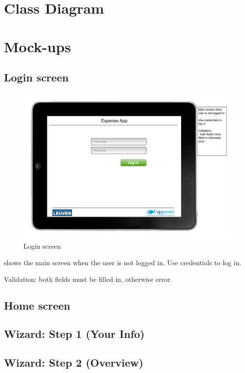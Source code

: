 

\section{Class Diagram}

\section{Mock-ups}

\subsection{Login screen}

\begin{figure}[h!]
    \includegraphics[width=\textwidth]{figs/poc/login-screen.pdf}
    \caption{Login screen}
    \label{fig:app-login-screen}
\end{figure}

 shows the main screen when the user is not logged in. Use credentials to log in.

Validation: both fields must be filled in, otherwise error.

\subsection{Home screen}

\subsection{Wizard: Step 1 (Your Info)}

\subsection{Wizard: Step 2 (Overview)}

